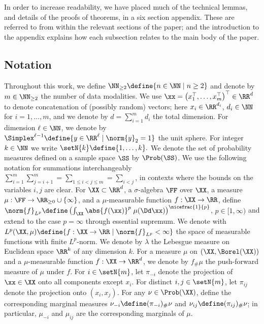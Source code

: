 \documentclass{article}
\begin{document}
In order to increase readability, we have placed much of the 
technical lemmas, and details of the proofs of theorems, 
in a six section appendix. These are referred to from within the 
relevant sections of the paper; and the introduction to the appendix
explains how each subsection relates to the main body of the paper.

\subsection{Notation} \label{ssec:NOT}
Throughout this work, we define $\NN_{\geq 2} \define \{n\in \NN \;\vert \;
 n\geq 2\}$ and denote by $m \in \NN_{\geq 2}$ the number of data
modalities. We use $\xx = \bigl(x_1^\top, \ldots, x_m^\top\bigr)^\top \in
 \RR^d$ to denote concatenation of (possibly random) vectors; here $x_i \in
 \RR^{d_i}$, $d_i \in \NN$ for $i=1, \ldots, m$, and we denote by $d =
 \sum_{i=1}^{m} d_i$ the total dimension. For dimension $\ell \in \NN$, we
denote by $\Simplex^{\ell -1} \define \{y \in \RR^\ell \; \vert\;
 \norm{y}_2 = 1\}$ the unit sphere. For integer $k\in \NN$ we write
$\setN{k} \define \{1, \ldots, k\}.$ We denote the set of probability
measures defined on a sample space $\SS$ by $\Prob(\SS)$. We use the
following notation for summations interchangeably $\sum_{i=1}^{m}
 \sum_{j=i+1}^{m} = \sum_{1 \leq i < j \leq m } = \sum_{i < j}$, in contexts
where the bounds on the variables $i, j$ are clear. For $\XX \subset
 \RR^d$, a $\sigma$-algebra $\FF$ over $\XX$, a measure $\mu : \FF \to
 \RR_{\geq 0} \cup \{\infty\}$, and a $\mu$-measurable function $f : \XX \to
 \RR$, define $\norm{f}_{L^p} \define \left(\int_{\XX} \abs{f(\xx)}^p \;
 \mu(\Dd \xx)\right)^{\nicefrac{1}{p}}$, $p\in [1,\infty)$ and extend to the
case $p=\infty$ through essential supremum. We denote with $L^p(\XX, \mu)
 \define \{f:\XX \to \RR \;\vert\; \norm{f}_{L^p} < \infty\}$ the space of
measurable functions with finite $L^p$-norm. We denote by $\lambda$ the
Lebesgue measure on Euclidean space $\RR^k$ of any dimension $k$. For a
measure $\mu$ on $(\XX, \Borel(\XX))$ and a $\mu$-measurable function $f:
 \XX \to \RR^d$, we denote by $f_{\#} \mu$ the push-forward measure of $\mu$
under $f$. For $i \in \setN{m}$, let $\pi_{-i}$ denote the projection
 of $\xx \in \XX$ onto all components except $x_i$. For distinct $i,j \in
  \setN{m}$, let $\pi_{ij}$ denote the projection onto $(x_i,x_j)$. For any
 $\nu \in \Prob(\XX)$, define the corresponding marginal measures $\nu_{-i}
  \define (\pi_{-i})_{\#}\nu$ and $\nu_{ij} \define (\pi_{ij})_{\#}\nu$; in
 particular, $\mu_{-i}$ and $\mu_{ij}$ are the corresponding marginals of
 $\mu$.
\end{document}
